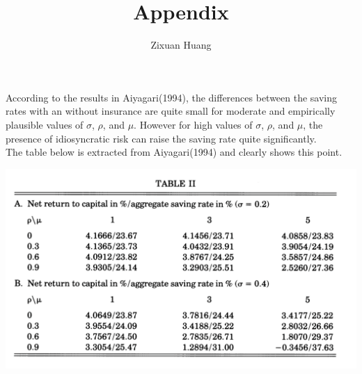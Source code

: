 \documentclass[]{article}
\title{Appendix}
\author{Zixuan Huang}
\begin{document}
\maketitle

According to the results in Aiyagari(1994), the differences between the saving rates with an without insurance are quite small for moderate and empirically plausible values of $\sigma$, $\rho$, and $\mu$. However for high values of $\sigma$, $\rho$, and $\mu$, the presence of idiosyncratic risk can raise the saving rate quite significantly. \\

The table below is extracted from Aiyagari(1994) and clearly shows this point. 

\centering
\includegraphics[scale=0.5]{Table-Aiyagari}
\end{document}
